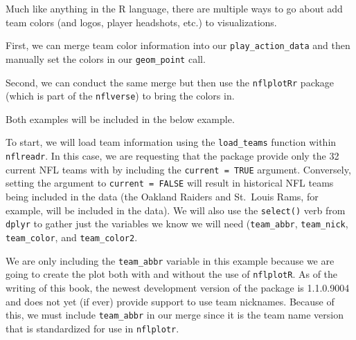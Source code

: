 \documentclass[
  letterpaper,
]{krantz}
\begin{document}
\begin{tcolorbox}[enhanced jigsaw, colback=white, leftrule=.75mm, breakable, colframe=quarto-callout-note-color-frame, bottomtitle=1mm, rightrule=.15mm, left=2mm, opacityback=0, bottomrule=.15mm, arc=.35mm, coltitle=black, colbacktitle=quarto-callout-note-color!10!white, toptitle=1mm, titlerule=0mm, title=\textcolor{quarto-callout-note-color}{\faInfo}\hspace{0.5em}{Note}, toprule=.15mm, opacitybacktitle=0.6]

Much like anything in the R language, there are multiple ways to go
about add team colors (and logos, player headshots, etc.) to
visualizations.

First, we can merge team color information into our
\texttt{play\_action\_data} and then manually set the colors in our
\texttt{geom\_point} call.

Second, we can conduct the same merge but then use the
\texttt{nflplotRr} package (which is part of the \texttt{nflverse}) to
bring the colors in.

Both examples will be included in the below example.

\end{tcolorbox}

To start, we will load team information using the \texttt{load\_teams}
function within \texttt{nflreadr}. In this case, we are requesting that
the package provide only the 32 current NFL teams with by including the
\texttt{current\ =\ TRUE} argument. Conversely, setting the argument to
\texttt{current\ =\ FALSE} will result in historical NFL teams being
included in the data (the Oakland Raiders and St.~Louis Rams, for
example, will be included in the data). We will also use the
\texttt{select()} verb from \texttt{dplyr} to gather just the variables
we know we will need (\texttt{team\_abbr}, \texttt{team\_nick},
\texttt{team\_color}, and \texttt{team\_color2}.

\begin{tcolorbox}[enhanced jigsaw, colback=white, leftrule=.75mm, breakable, colframe=quarto-callout-important-color-frame, bottomtitle=1mm, rightrule=.15mm, left=2mm, opacityback=0, bottomrule=.15mm, arc=.35mm, coltitle=black, colbacktitle=quarto-callout-important-color!10!white, toptitle=1mm, titlerule=0mm, title=\textcolor{quarto-callout-important-color}{\faExclamation}\hspace{0.5em}{Important}, toprule=.15mm, opacitybacktitle=0.6]

We are only including the \texttt{team\_abbr} variable in this example
because we are going to create the plot both with and without the use of
\texttt{nflplotR}. As of the writing of this book, the newest
development version of the package is 1.1.0.9004 and does not yet (if
ever) provide support to use team nicknames. Because of this, we must
include \texttt{team\_abbr} in our merge since it is the team name
version that is standardized for use in \texttt{nflplotr}.

\end{tcolorbox}
\end{document}
